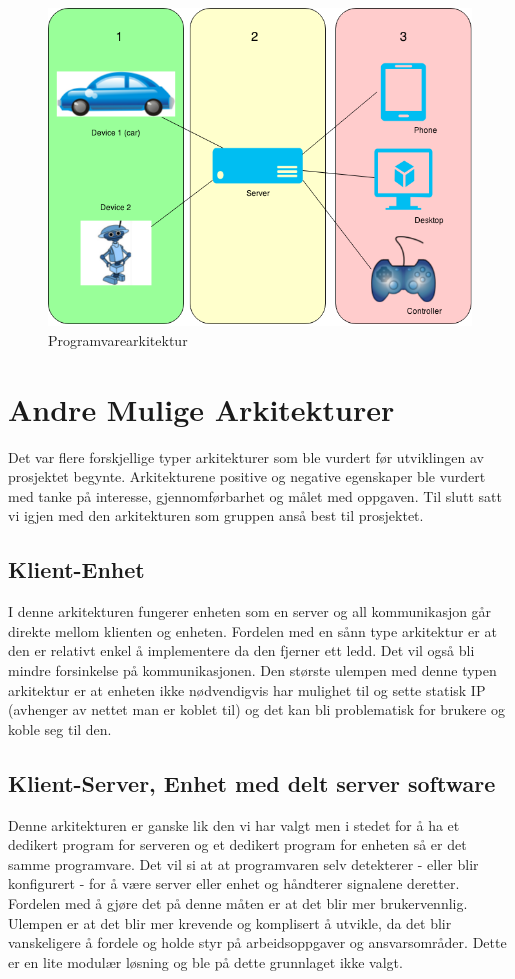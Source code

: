 \documentclass[12pt]{report}
\begin{document}
\begin{figure}[H]
	\includegraphics[scale=0.7]{imgs/Arcitechture}
	\centering
	\caption{Programvarearkitektur}
	\label{Ark}
\end{figure}

\section{Andre Mulige Arkitekturer}
Det var flere forskjellige typer arkitekturer som ble vurdert før utviklingen av prosjektet begynte. Arkitekturene positive og negative egenskaper ble vurdert med tanke på interesse, gjennomførbarhet og målet med oppgaven. Til slutt satt vi igjen med den arkitekturen som gruppen anså best til prosjektet.

\subsection{Klient-Enhet}
I denne arkitekturen fungerer enheten som en server og all kommunikasjon går direkte mellom klienten og enheten. Fordelen med en sånn type arkitektur er at den er relativt enkel å implementere da den fjerner ett ledd. Det vil også bli mindre forsinkelse på kommunikasjonen. Den største ulempen med denne typen arkitektur er at enheten ikke nødvendigvis har mulighet til og sette statisk IP (avhenger av nettet man er koblet til) og det kan bli problematisk for brukere og koble seg til den.

\subsection{Klient-Server, Enhet med delt server software}
Denne arkitekturen er ganske lik den vi har valgt men i stedet for å ha et dedikert program for serveren og et dedikert program for enheten så er det samme programvare. Det vil si at at programvaren selv detekterer - eller blir konfigurert - for å være server eller enhet og håndterer signalene deretter. Fordelen med å gjøre det på denne måten er at det blir mer brukervennlig. Ulempen er at det blir mer krevende og komplisert å utvikle, da det blir vanskeligere å fordele og holde styr på arbeidsoppgaver og ansvarsområder. Dette er en lite modulær løsning og ble på dette grunnlaget ikke valgt.
\end{document}
